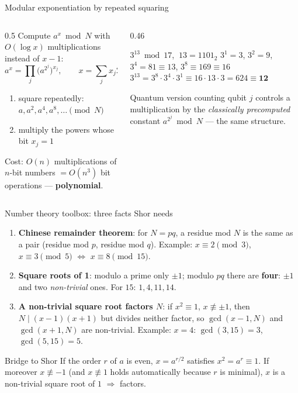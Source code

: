 \documentclass[aspectratio=169,11pt]{beamer}
\newcommand{\hl}[1]{{\color{qorange}\textbf{#1}}}
\newcommand{\key}[1]{{\color{qdark}\textbf{#1}}}
\begin{document}
\begin{frame}[label=fModExp]{Modular exponentiation by repeated squaring}
  \begin{columns}[T]
    \begin{column}{0.5\textwidth}
      \small
      Compute $a^x \bmod N$ with $O(\log x)$ multiplications instead of $x - 1$:
      \[ a^x = \prod_{j}\big(a^{2^j}\big)^{x_j},\qquad x = \sum_jx_j2^j. \]
      \begin{enumerate}\itemsep1pt
        \item square repeatedly: $a, a^2, a^4, a^8, \dots \pmod N$
        \item multiply the powers whose bit $x_j = 1$
      \end{enumerate}
      Cost: $O(n)$ multiplications of $n$-bit numbers $= O(n^3)$ bit operations --- \hl{polynomial}.
    \end{column}
    \begin{column}{0.46\textwidth}
      \begin{exampleblock}{$3^{13} \bmod 17$, $\ 13 = 1101_2$}
        \small
        $3^1 = 3$, $3^2 = 9$, $3^4 = 81 \equiv 13$, $3^8 \equiv 169 \equiv 16$\\[2pt]
        $3^{13} = 3^8\cdot3^4\cdot3^1 \equiv 16\cdot13\cdot3 = 624 \equiv \mathbf{12}$
      \end{exampleblock}
      \begin{block}{Quantum version}
        \small counting qubit $j$ controls a multiplication by the \emph{classically precomputed} constant $a^{2^j} \bmod N$ --- the same structure.
      \end{block}
    \end{column}
  \end{columns}
\end{frame}

\begin{frame}[label=fNTExamples]{Number theory toolbox: three facts Shor needs}
  \small
  \begin{enumerate}\itemsep3pt
    \item \key{Chinese remainder theorem}: for $N = pq$, a residue mod $N$ is the same as a pair (residue mod $p$, residue mod $q$). Example: $x \equiv 2 \pmod 3$, $x \equiv 3 \pmod 5$ $\iff$ $x \equiv 8 \pmod{15}$.
    \item \key{Square roots of 1}: modulo a prime only $\pm1$; modulo $pq$ there are \hl{four}: $\pm1$ and two \emph{non-trivial} ones.
          For $15$: $1, 4, 11, 14$.
    \item \key{A non-trivial square root factors $N$}: if $x^2 \equiv 1$, $x \not\equiv \pm1$, then $N \mid (x - 1)(x + 1)$ but divides neither factor, so
          $\gcd(x - 1, N)$ and $\gcd(x + 1, N)$ are non-trivial. Example: $x = 4$: $\gcd(3, 15) = 3$, $\gcd(5, 15) = 5$.
  \end{enumerate}
  \begin{block}{Bridge to Shor}
    \small If the order $r$ of $a$ is even, $x = a^{r/2}$ satisfies $x^2 = a^r \equiv 1$. If moreover $x \not\equiv -1$ (and $x \not\equiv 1$ holds automatically because $r$ is
    minimal), $x$ is a non-trivial square root of $1$ $\Rightarrow$ factors.
  \end{block}
\end{frame}
\end{document}
